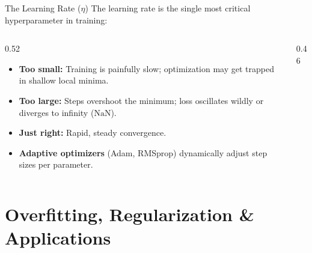 \begin{frame}{The Learning Rate ($\eta$)}
    The learning rate is the single most critical hyperparameter in training:
    \begin{columns}[c]
        \begin{column}{0.52\textwidth}
            \begin{itemize}
                \item \textbf{Too small:} Training is painfully slow; optimization may get trapped in shallow local minima.
                \item \textbf{Too large:} Steps overshoot the minimum; loss oscillates wildly or diverges to infinity ($\mathrm{NaN}$).
                \item \textbf{Just right:} Rapid, steady convergence.
                \item \textbf{Adaptive optimizers} (Adam, RMSprop) dynamically adjust step sizes per parameter.
            \end{itemize}
        \end{column}
        \begin{column}{0.46\textwidth}
            \centering
        \end{column}
    \end{columns}
\end{frame}


\section{Overfitting, Regularization \& Applications}

